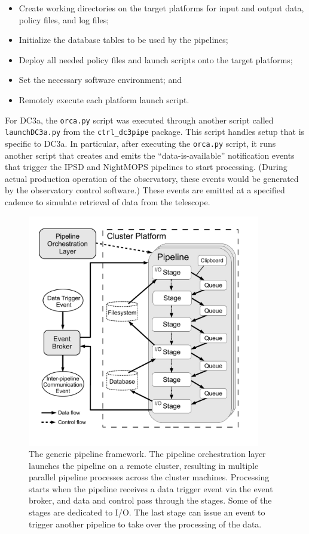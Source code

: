 \begin{itemize}
\item Create working directories on the target platforms for input and
  output data, policy files, and log files;
\item Initialize the database tables to be used by the pipelines;
\item Deploy all needed policy files and launch scripts onto the
  target platforms;
\item Set the necessary software environment; and 
\item Remotely execute each platform launch script.
\end{itemize}

For DC3a, the \texttt{orca.py} script was executed through another
script called \texttt{launchDC3a.py} from the \texttt{ctrl\_dc3pipe}
package.  This script handles setup that is specific to DC3a.  In
particular, after executing the \texttt{orca.py} script, it runs
another script that creates and emits the ``data-is-available'' notification events
that trigger the IPSD and NightMOPS pipelines to start processing.
(During actual production operation of the observatory, these events
would be generated by the observatory control software.)  These events
are emitted at a specified cadence to simulate retrieval of data from
the telescope.  

\begin{figure}[t]
\begin{center}
\includegraphics[height=4.0in,bb=25 45 562 583]{images/pex.pdf}
\caption{The generic pipeline framework. The pipeline orchestration
  layer launches the pipeline on a remote cluster, resulting in
  multiple parallel pipeline processes across the cluster machines.
  Processing starts when the pipeline receives a data trigger event
  via the event broker, and data and control pass through the stages.
  Some of the stages are dedicated to I/O.  The last stage can issue
  an event to trigger another pipeline to take over the processing of
  the data.
\label{fig:pex}}
\end{center}
\end{figure}

